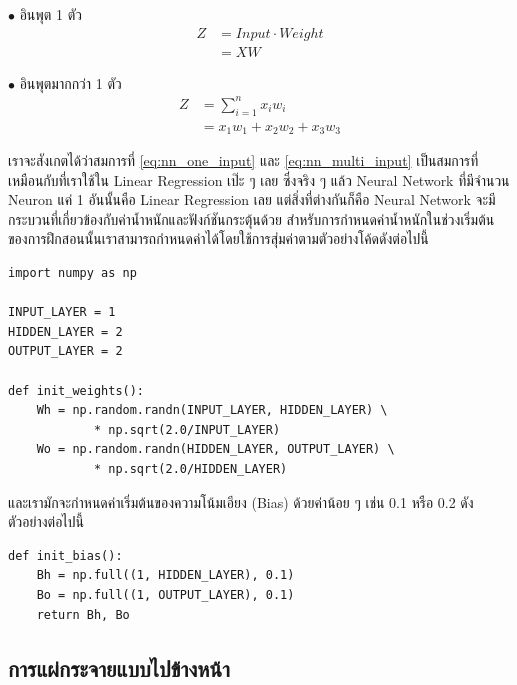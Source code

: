 \noindent $\bullet$ อินพุต 1 ตัว
\begin{align}\label{eq:nn_one_input}
    Z & = Input \cdot Weight \nonumber \\
      & = X W
\end{align}

\noindent $\bullet$ อินพุตมากกว่า 1 ตัว
\begin{align}\label{eq:nn_multi_input}
    Z & = \sum_{i=1}^{n}x_i w_i \nonumber \\
      & = x_1 w_1 + x_2 w_2 + x_3 w_3
\end{align}

เราจะสังเกตได้ว่าสมการที่ \eqref{eq:nn_one_input} และ \eqref{eq:nn_multi_input} เป็นสมการที่เหมือนกับที่เราใช้ใน Linear
Regression เป๊ะ ๆ เลย ซึ่งจริง ๆ แล้ว Neural Network ที่มีจำนวน Neuron แค่ 1 อันนั้นคือ Linear Regression เลย แต่สิ่งที่ต่างกันก็คือ Neural Network จะมีกระบวนที่เกี่ยวข้องกับค่าน้ำหนักและฟังก์ชันกระตุ้นด้วย สำหรับการกำหนดค่าน้ำหนักในช่วงเริ่มต้นของการฝึกสอนนั้นเราสามารถกำหนดค่าได้โดยใช้การสุ่มค่าตามตัวอย่างโค้ดดังต่อไปนี้

\begin{lstlisting}[style=MyPython]
import numpy as np

INPUT_LAYER = 1
HIDDEN_LAYER = 2
OUTPUT_LAYER = 2

def init_weights():
    Wh = np.random.randn(INPUT_LAYER, HIDDEN_LAYER) \
            * np.sqrt(2.0/INPUT_LAYER)
    Wo = np.random.randn(HIDDEN_LAYER, OUTPUT_LAYER) \
            * np.sqrt(2.0/HIDDEN_LAYER)
\end{lstlisting}

\vspace{1em}

\noindent และเรามักจะกำหนดค่าเริ่มต้นของความโน้มเอียง (Bias) ด้วยค่าน้อย ๆ เช่น 0.1 หรือ 0.2 ดังตัวอย่างต่อไปนี้

\begin{lstlisting}[style=MyPython]
def init_bias():
    Bh = np.full((1, HIDDEN_LAYER), 0.1)
    Bo = np.full((1, OUTPUT_LAYER), 0.1)
    return Bh, Bo
\end{lstlisting}

\subsection{การแผ่กระจายแบบไปข้างหน้า}
\label{ssec:forward_prop}

